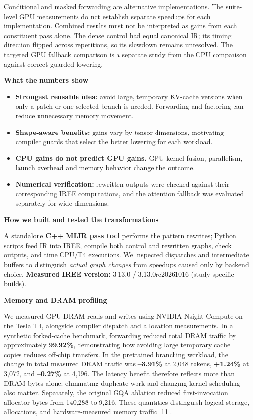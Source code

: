 \documentclass[10pt,a4paper]{article}
\newcommand{\smallhead}[1]{\vspace{5pt}\textbf{#1}\par}
\begin{document}
{\footnotesize
Conditional and masked forwarding are alternative implementations.
The suite-level GPU measurements do not establish separate
speedups for each implementation. Combined results must not
be interpreted as gains from each constituent pass alone.
The dense control had equal canonical IR; its timing direction
flipped across repetitions, so its slowdown remains unresolved.
The targeted GPU fallback comparison is a separate study from
the CPU comparison against correct guarded lowering.
\par}
\smallhead{What the numbers show}
\vspace{-0.5cm}
\begin{itemize}\setlength\itemsep{2pt}
\item \textbf{Strongest reusable idea:} avoid large, temporary KV-cache versions when only a patch or one selected branch is needed. Forwarding and factoring can reduce unnecessary memory movement.
\item \textbf{Shape-aware benefits:} gains vary by tensor dimensions, motivating compiler guards that select the better lowering for each workload.
\item \textbf{CPU gains do not predict GPU gains.} GPU kernel fusion, parallelism, launch overhead and memory behavior change the outcome.
\item \textbf{Numerical verification:} rewritten outputs were checked against their corresponding IREE computations, and the attention fallback was evaluated separately for wide dimensions.
\end{itemize}
\vspace{-0.5cm}
\smallhead{How we built and tested the transformations}
A standalone \textbf{C++ MLIR pass tool} performs the pattern rewrites; Python scripts feed IR into IREE, compile both control and rewritten graphs, check outputs, and time CPU/T4 executions. We inspected dispatches and intermediate buffers to distinguish \emph{actual graph changes} from speedups caused only by backend choice. \textbf{Measured IREE version:} 3.13.0 / 3.13.0rc20261016 (study-specific builds).

\smallhead{Memory and DRAM profiling}
We measured GPU DRAM reads and writes using NVIDIA Nsight Compute on the Tesla T4, alongside compiler dispatch and allocation measurements. In a synthetic forked-cache benchmark, forwarding reduced total DRAM traffic by approximately \textbf{99.92\%}, demonstrating how avoiding large temporary cache copies reduces off-chip transfers. In the pretrained branching workload, the change in total measured DRAM traffic was \textbf{--3.91\%} at 2,048 tokens, \textbf{+1.24\%} at 3,072, and \textbf{--0.27\%} at 4,096. The latency benefit therefore reflects more than DRAM bytes alone: eliminating duplicate work and changing kernel scheduling also matter. Separately, the original GQA ablation reduced first-invocation allocator bytes from 140,288 to 9,216. These quantities distinguish logical storage, allocations, and hardware-measured memory traffic [11].
\end{document}
